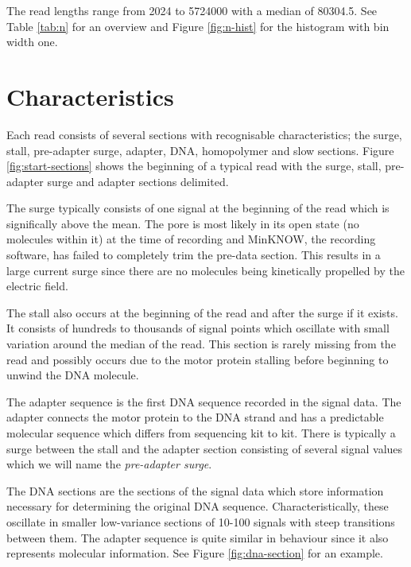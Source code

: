 


The read lengths range from 2024 to \num{5724000} with a median of 80304.5. See Table \ref{tab:n} for an overview and Figure \ref{fig:n-hist} for the histogram with bin width one.






\section{Characteristics}

Each read consists of several sections with recognisable characteristics; the surge, stall, pre-adapter surge, adapter, DNA, homopolymer and slow sections. Figure \ref{fig:start-sections} shows the beginning of a typical read with the surge, stall, pre-adapter surge and adapter sections delimited.

The surge typically consists of one signal at the beginning of the read which is significally above the mean. The pore is most likely in its open state (no molecules within it) at the time of recording and MinKNOW, the recording software, has failed to completely trim the pre-data section. This results in a large current surge since there are no molecules being kinetically propelled by the electric field.

The stall also occurs at the beginning of the read and after the surge if it exists. It consists of hundreds to thousands of signal points which oscillate with small variation around the median of the read. This section is rarely missing from the read and possibly occurs due to the motor protein stalling before beginning to unwind the DNA molecule.

The adapter sequence is the first DNA sequence recorded in the signal data. The adapter connects the motor protein to the DNA strand and has a predictable molecular sequence which differs from sequencing kit to kit. There is typically a surge between the stall and the adapter section consisting of several signal values which we will name the \textit{pre-adapter surge}.



The DNA sections are the sections of the signal data which store information necessary for determining the original DNA sequence. Characteristically, these oscillate in smaller low-variance sections of 10-100 signals with steep transitions between them. The adapter sequence is quite similar in behaviour since it also represents molecular information. See Figure \ref{fig:dna-section} for an example.

